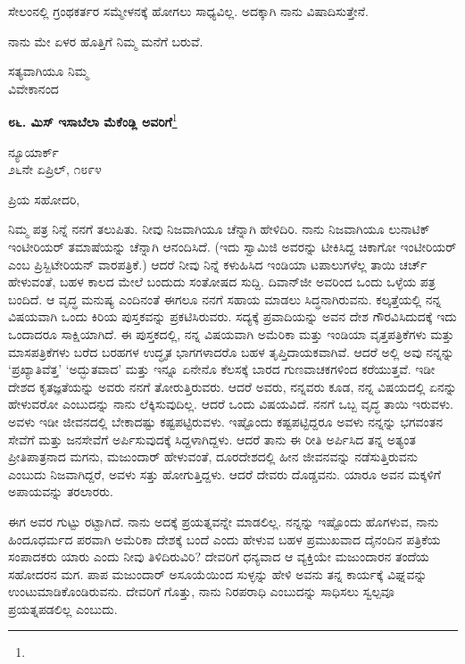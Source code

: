 ಸೇಲಂನಲ್ಲಿ ಗ್ರಂಥಕರ್ತರ ಸಮ್ಮೇಳನಕ್ಕೆ ಹೋಗಲು ಸಾಧ್ಯವಿಲ್ಲ. ಅದಕ್ಕಾಗಿ ನಾನು ವಿಷಾದಿಸುತ್ತೇನೆ.

ನಾನು ಮೇ ಏಳರ ಹೊತ್ತಿಗೆ ನಿಮ್ಮ ಮನೆಗೆ ಬರುವೆ.

\vspace{-0.5cm}

{\flushright
ಸತ್ಯವಾಗಿಯೂ ನಿಮ್ಮ\\ವಿವೇಕಾನಂದ\par}

\begin{center}
\textbf{೮೬. ಮಿಸ್ ಇಸಾಬೆಲಾ ಮೆಕೆಂಡ್ಲಿ ಅವರಿಗೆ}\footnote{}
\end{center}

\vspace{-0.5cm}

\begin{flushright}
ನ್ಯೂಯಾರ್ಕ್\\೨೬ನೇ ಏಪ್ರಿಲ್, ೧೮೯೪
\end{flushright}

\noindent
ಪ್ರಿಯ ಸಹೋದರಿ,

ನಿಮ್ಮ ಪತ್ರ ನಿನ್ನೆ ನನಗೆ ತಲುಪಿತು. ನೀವು ನಿಜವಾಗಿಯೂ ಚೆನ್ನಾಗಿ ಹೇಳಿದಿರಿ. ನಾನು ನಿಜವಾಗಿಯೂ ಲುನಾಟಿಕ್ ಇಂಟೀರಿಯರ್‌ ತಮಾಷೆಯನ್ನು ಚೆನ್ನಾಗಿ ಆನಂದಿಸಿದೆ. (ಇದು ಸ್ವಾಮಿಜಿ ಅವರನ್ನು ಟೀಕಿಸಿದ್ದ ಚಿಕಾಗೋ ಇಂಟೀರಿಯರ್‌ ಎಂಬ ಪ್ರಿಸ್ಬಿಟೇರಿಯನ್ ವಾರಪತ್ರಿಕೆ.) ಆದರೆ ನೀವು ನಿನ್ನೆ ಕಳುಹಿಸಿದ ಇಂಡಿಯಾ ಟಪಾಲುಗಳೆಲ್ಲ ತಾಯಿ ಚರ್ಚ್ ಹೇಳುವಂತೆ, ಬಹಳ ಕಾಲದ ಮೇಲೆ ಬಂದುದು ಸಂತೋಷದ ಸುದ್ದಿ. ದಿವಾನ್‌ಜೀ ಅವರಿಂದ ಒಂದು ಒಳ್ಳೆಯ ಪತ್ರ ಬಂದಿದೆ. ಆ ವೃದ್ಧ ಮನುಷ್ಯ ಎಂದಿನಂತೆ ಈಗಲೂ ನನಗೆ ಸಹಾಯ ಮಾಡಲು ಸಿದ್ಧನಾಗಿರುವನು. ಕಲ್ಕತ್ತೆಯಲ್ಲಿ ನನ್ನ ವಿಷಯವಾಗಿ ಒಂದು ಕಿರಿಯ ಪುಸ್ತಕವನ್ನು ಪ್ರಕಟಿಸಿರುವರು. ಸದ್ಯಕ್ಕೆ ಪ್ರವಾದಿಯನ್ನು ಅವನ ದೇಶ ಗೌರವಿಸಿದುದಕ್ಕೆ ಇದು ಒಂದಾದರೂ ಸಾಕ್ಷಿಯಾಗಿದೆ. ಈ ಪುಸ್ತಕದಲ್ಲಿ, ನನ್ನ ವಿಷಯವಾಗಿ ಅಮೆರಿಕಾ ಮತ್ತು ಇಂಡಿಯಾ ವೃತ್ತಪತ್ರಿಕೆಗಳು ಮತ್ತು ಮಾಸಪತ್ರಿಕೆಗಳು ಬರೆದ ಬರಹಗಳ ಉದ್ಧೃತ ಭಾಗಗಳಾದರೊ ಬಹಳ ತೃಪ್ತಿದಾಯಕವಾಗಿವೆ. ಆದರೆ ಅಲ್ಲಿ ಅವು ನನ್ನನ್ನು `ಪ್ರಖ್ಯಾತಿವೆತ್ತ' `ಅದ್ಭುತವಾದ' ಮತ್ತು ಇನ್ನೂ ಏನೇನೊ ಕೆಲಸಕ್ಕೆ ಬಾರದ ಗುಣವಾಚಕಗಳಿಂದ ಕರೆಯುತ್ತವೆ. ಇಡೀ ದೇಶದ ಕೃತಜ್ಞತೆಯನ್ನು ಅವರು ನನಗೆ ತೋರುತ್ತಿರುವರು. ಆದರೆ ಅವರು, ನನ್ನವರು ಕೂಡ, ನನ್ನ ವಿಷಯದಲ್ಲಿ ಏನನ್ನು ಹೇಳುವರೋ ಎಂಬುದನ್ನು ನಾನು ಲೆಕ್ಕಿಸುವುದಿಲ್ಲ. ಆದರೆ ಒಂದು ವಿಷಯವಿದೆ. ನನಗೆ ಒಬ್ಬ ವೃದ್ಧ ತಾಯಿ ಇರುವಳು. ಅವಳು ಇಡೀ ಜೀವನದಲ್ಲಿ ಬೇಕಾದಷ್ಟು ಕಷ್ಟಪಟ್ಟಿರುವಳು. ಇಷ್ಟೊಂದು ಕಷ್ಟಪಟ್ಟಿದ್ದರೂ ಅವಳು ನನ್ನನ್ನು ಭಗವಂತನ ಸೇವೆಗೆ ಮತ್ತು ಜನಸೇವೆಗೆ ಅರ್ಪಿಸುವುದಕ್ಕೆ ಸಿದ್ದಳಾಗಿದ್ದಳು. ಆದರೆ ತಾನು ಈ ರೀತಿ ಅರ್ಪಿಸಿದ ತನ್ನ ಅತ್ಯಂತ ಪ್ರೀತಿಪಾತ್ರನಾದ ಮಗನು, ಮಜುಂದಾರ್‌ ಹೇಳುವಂತೆ, ದೂರದೇಶದಲ್ಲಿ ಹೀನ ಜೀವನವನ್ನು ನಡೆಸುತ್ತಿರುವನು ಎಂಬುದು ನಿಜವಾಗಿದ್ದರೆ, ಅವಳು ಸತ್ತು ಹೋಗುತ್ತಿದ್ದಳು. ಆದರೆ ದೇವರು ದೊಡ್ಡವನು. ಯಾರೂ ಅವನ ಮಕ್ಕಳಿಗೆ ಅಪಾಯವನ್ನು ತರಲಾರರು.

ಈಗ ಅವರ ಗುಟ್ಟು ರಟ್ಟಾಗಿದೆ. ನಾನು ಅದಕ್ಕೆ ಪ್ರಯತ್ನವನ್ನೇ ಮಾಡಲಿಲ್ಲ. ನನ್ನನ್ನು ಇಷ್ಟೊಂದು ಹೊಗಳುವ, ನಾನು ಹಿಂದೂಧರ್ಮದ ಪರವಾಗಿ ಅಮೆರಿಕಾ ದೇಶಕ್ಕೆ ಬಂದೆ ಎಂದು ಹೇಳುವ ಬಹಳ ಪ್ರಮುಖವಾದ ದೈನಂದಿನ ಪತ್ರಿಕೆಯ ಸಂಪಾದಕರು ಯಾರು ಎಂದು ನೀವು ತಿಳಿದಿರುವಿರಿ? ದೇವರಿಗೆ ಧನ್ಯವಾದ \enginline{-} ಆ ವ್ಯಕ್ತಿಯೇ ಮಜುಂದಾರನ ತಂದೆಯ ಸಹೋದರನ ಮಗ. ಪಾಪ ಮಜುಂದಾರ್ \enginline{-} ಅಸೂಯೆಯಿಂದ ಸುಳ್ಳನ್ನು ಹೇಳಿ ಅವನು ತನ್ನ ಕಾರ್ಯಕ್ಕೆ ವಿಘ್ನವನ್ನು ಉಂಟುಮಾಡಿಕೊಂಡಿರುವನು. ದೇವರಿಗೆ ಗೊತ್ತು, ನಾನು ನಿರಪರಾಧಿ ಎಂಬುದನ್ನು ಸಾಧಿಸಲು ಸ್ವಲ್ಪವೂ ಪ್ರಯತ್ನಪಡಲಿಲ್ಲ ಎಂಬುದು.

